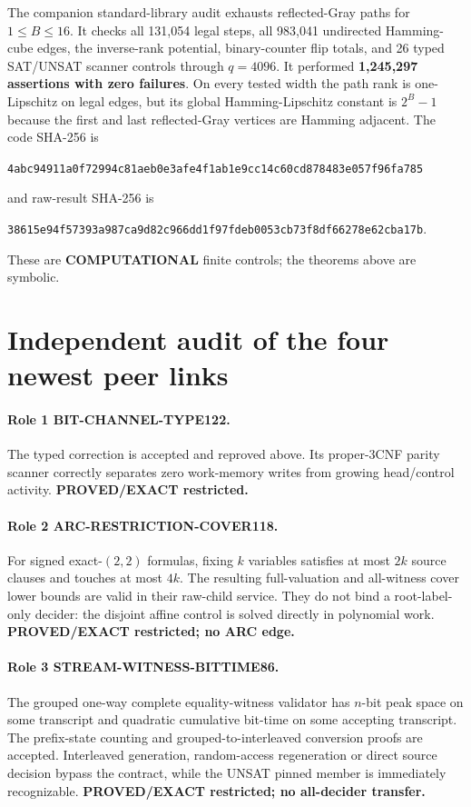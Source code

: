 \documentclass[11pt]{article}
\begin{document}
The companion standard-library audit exhausts reflected-Gray paths for
$1\le B\le16$.  It checks all 131,054 legal steps, all 983,041 undirected
Hamming-cube edges, the inverse-rank potential, binary-counter flip totals,
and 26 typed SAT/UNSAT scanner controls through $q=4096$.  It performed
\textbf{1,245,297 assertions with zero failures}.  On every tested width the
path rank is one-Lipschitz on legal edges, but its global Hamming-Lipschitz
constant is $2^B-1$ because the first and last reflected-Gray vertices are
Hamming adjacent.  The code SHA-256 is
\begin{center}\small
\texttt{4abc94911a0f72994c81aeb0e3afe4f1ab1e9cc14c60cd878483e057f96fa785}
\end{center}
and raw-result SHA-256 is
\begin{center}\small
\texttt{38615e94f57393a987ca9d82c966dd1f97fdeb0053cb73f8df66278e62cba17b}.
\end{center}
These are \textbf{COMPUTATIONAL} finite controls; the theorems above are
symbolic.

\section{Independent audit of the four newest peer links}

\paragraph{Role 1 BIT-CHANNEL-TYPE122.}
The typed correction is accepted and reproved above.  Its proper-3CNF parity
scanner correctly separates zero work-memory writes from growing
head/control activity.  \textbf{PROVED/EXACT restricted.}

\paragraph{Role 2 ARC-RESTRICTION-COVER118.}
For signed exact-$(2,2)$ formulas, fixing $k$ variables satisfies at most
$2k$ source clauses and touches at most $4k$.  The resulting full-valuation
and all-witness cover lower bounds are valid in their raw-child service.
They do not bind a root-label-only decider: the disjoint affine control is
solved directly in polynomial work.  \textbf{PROVED/EXACT restricted; no
ARC edge.}

\paragraph{Role 3 STREAM-WITNESS-BITTIME86.}
The grouped one-way complete equality-witness validator has $n$-bit peak
space on some transcript and quadratic cumulative bit-time on some accepting
transcript.  The prefix-state counting and grouped-to-interleaved conversion
proofs are accepted.  Interleaved generation, random-access regeneration or
direct source decision bypass the contract, while the UNSAT pinned member is
immediately recognizable.  \textbf{PROVED/EXACT restricted; no all-decider
transfer.}
\end{document}
